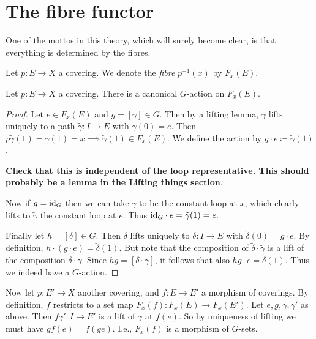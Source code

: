 
\section{The fibre functor}

One of the mottos in this theory, which will surely become clear, is
that everything is determined by the fibres.

\begin{definition}
  Let $p : E \to X$ a covering. We denote the \emph{fibre} $p^{-1}(x)$
  by $F_x(E)$.
\end{definition}

\begin{lemma}
  Let $p : E \to X$ a covering. There is a canonical $G$-action on
  $F_x(E)$.
\end{lemma}

\begin{proof}
  Let $e \in F_x(E)$ and $g = [\gamma] \in G$. Then by a lifting
  lemma, $\gamma$ lifts uniquely to a path $\tilde\gamma : I \to E$
  with $\gamma(0) = e$. Then $p\tilde\gamma(1) = \gamma(1) = x
  \implies \tilde\gamma(1) \in F_x(E)$. We define the action by $g
  \cdot e \coloneqq \tilde\gamma(1)$.

  \medskip
  \textbf{Check that this is independent of the loop
    representative. This should probably be a lemma in the Lifting
    things section}.

  \medskip
  Now if $g = \mathrm{id}_G$ then we can take $\gamma$ to be the constant loop
  at $x$, which clearly lifts to $\tilde\gamma$ the constant loop at
  $e$. Thus $\mathrm{id}_G \cdot e = \tilde\gamma(1) = e$.

  \medskip
  Finally let $h = [\delta] \in G$. Then $\delta$ lifts uniquely to
  $\tilde\delta : I \to E$ with $\tilde\delta(0) = g \cdot e$. By
  definition, $h \cdot (g \cdot e) = \tilde\delta(1)$. But note that
  the composition of $\tilde\delta \cdot \tilde\gamma$ is a lift of
  the composition $\delta \cdot \gamma$. Since $hg = [\delta \cdot
    \gamma]$, it follows that also $hg \cdot e =
  \tilde\delta(1)$. Thus we indeed have a $G$-action.
\end{proof}

Now let $p : E' \to X$ another covering, and $f : E \to E'$ a
morphism of coverings. By definition, $f$ restricts to a set map
$F_x(f) : F_x(E) \to F_x(E')$. Let $e,g,\gamma,\gamma'$ as
above. Then $f\gamma' : I \to E'$ is a lift of $\gamma$ at
$f(e)$. So by uniqueness of lifting we must have $gf(e) =
f(ge)$. I.e., $F_x(f)$ is a morphism of $G$-sets.

